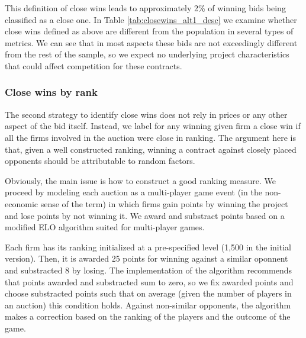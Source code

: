 This definition of close wins leads to approximately 2\% of winning bids being classified as a close one. In Table \ref{tab:closewins_alt1_desc} we examine whether close wins defined as above are different from the population in several types of metrics. We can see that in most aspects these bids are not exceedingly different from the rest of the sample, so we expect no underlying project characteristics that could affect competition for these contracts.



\subsubsection{Close wins by rank}

The second strategy to identify close wins does not rely in prices or any other aspect of the bid itself. Instead, we label for any winning given firm a close win if all the firms involved in the auction were close in ranking. The argument here is that, given a well constructed ranking, winning a contract against closely placed opponents should be attributable to random factors.

Obviously, the main issue is how to construct a good ranking measure. We proceed by  modeling each auction as a multi-player game event (in the non-economic sense of the term) in which firms gain points by winning the project and lose points by not winning it. We award and substract points based on a modified ELO algorithm suited for multi-player games.

Each firm has its ranking initialized at a pre-specified level (1,500 in the initial version). Then, it is awarded 25 points for winning against a similar oponnent and substracted 8 by losing. The implementation of the algorithm recommends that points awarded and substracted sum to zero, so we fix awarded points and choose substracted points such that on average (given the number of players in an auction) this condition holds. Against non-similar opponents, the algorithm makes a correction based on the ranking of the players and the outcome of the game.

